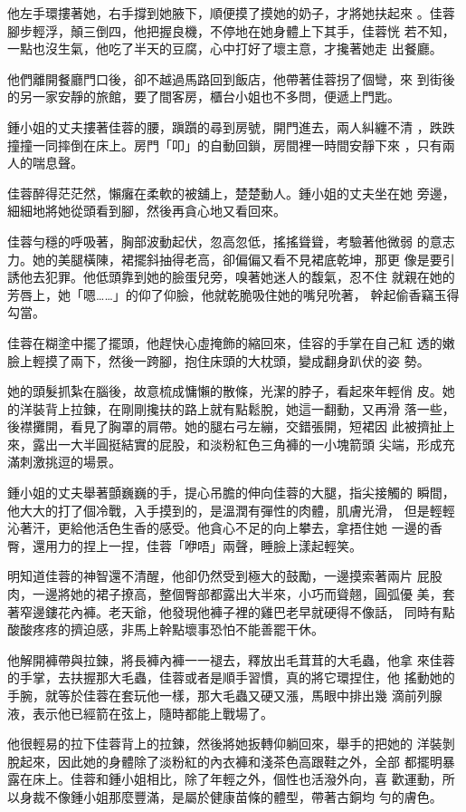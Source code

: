 他左手環摟著她，右手撐到她腋下，順便摸了摸她的奶子，才將她扶起來
。佳蓉腳步輕浮，顛三倒四，他把握良機，不停地在她身體上下其手，佳蓉恍
若不知，一點也沒生氣，他吃了半天的豆腐，心中打好了壞主意，才攙著她走
出餐廳。

他們離開餐廳門口後，卻不越過馬路回到飯店，他帶著佳蓉拐了個彎，來
到街後的另一家安靜的旅館，要了間客房，櫃台小姐也不多問，便遞上門匙。

鍾小姐的丈夫摟著佳蓉的腰，蹎躓的尋到房號，開門進去，兩人糾纏不清
，跌跌撞撞一同摔倒在床上。房門「叩」的自動回鎖，房間裡一時間安靜下來
，只有兩人的喘息聲。

佳蓉醉得茫茫然，懶癱在柔軟的被舖上，楚楚動人。鍾小姐的丈夫坐在她
旁邊，細細地將她從頭看到腳，然後再貪心地又看回來。

佳蓉勻穩的呼吸著，胸部波動起伏，忽高忽低，搖搖聳聳，考驗著他微弱
的意志力。她的美腿橫陳，裙擺斜抽得老高，卻偏偏又看不見裙底乾坤，那更
像是要引誘他去犯罪。他低頭靠到她的臉蛋兒旁，嗅著她迷人的馥氣，忍不住
就親在她的芳唇上，她「嗯……」的仰了仰臉，他就乾脆吸住她的嘴兒吮著，
幹起偷香竊玉得勾當。

佳蓉在糊塗中擺了擺頭，他趕快心虛掩飾的縮回來，佳容的手掌在自己紅
透的嫩臉上輕摸了兩下，然後一跨腳，抱住床頭的大枕頭，變成翻身趴伏的姿
勢。

她的頭髮抓紮在腦後，故意梳成慵懶的散條，光潔的脖子，看起來年輕俏
皮。她的洋裝背上拉鍊，在剛剛攙扶的路上就有點鬆脫，她這一翻動，又再滑
落一些，後襟攤開，看見了胸罩的肩帶。她的腿右弓左繃，交錯張開，短裙因
此被擠扯上來，露出一大半圓挺結實的屁股，和淡粉紅色三角褲的一小塊箭頭
尖端，形成充滿刺激挑逗的場景。

鍾小姐的丈夫舉著顫巍巍的手，提心吊膽的伸向佳蓉的大腿，指尖接觸的
瞬間，他大大的打了個冷戰，入手摸到的，是溫潤有彈性的肉體，肌膚光滑，
但是輕輕沁著汗，更給他活色生香的感受。他貪心不足的向上攀去，拿捂住她
一邊的香臀，還用力的捏上一捏，佳蓉「咿唔」兩聲，睡臉上漾起輕笑。

明知道佳蓉的神智還不清醒，他卻仍然受到極大的鼓勵，一邊摸索著兩片
屁股肉，一邊將她的裙子撩高，整個臀部都露出大半來，小巧而聳翹，圓弧優
美，套著窄邊鏤花內褲。老天爺，他發現他褲子裡的雞巴老早就硬得不像話，
同時有點酸酸疼疼的擠迫感，非馬上幹點壞事恐怕不能善罷干休。

他解開褲帶與拉鍊，將長褲內褲一一褪去，釋放出毛茸茸的大毛蟲，他拿
來佳蓉的手掌，去扶握那大毛蟲，佳蓉或者是順手習慣，真的將它環捏住，他
搖動她的手腕，就等於佳蓉在套玩他一樣，那大毛蟲又硬又漲，馬眼中排出幾
滴前列腺液，表示他已經箭在弦上，隨時都能上戰場了。

他很輕易的拉下佳蓉背上的拉鍊，然後將她扳轉仰躺回來，舉手的把她的
洋裝剝脫起來，因此她的身體除了淡粉紅的內衣褲和淺茶色高跟鞋之外，全部
都擺明暴露在床上。佳蓉和鍾小姐相比，除了年輕之外，個性也活潑外向，喜
歡運動，所以身裁不像鍾小姐那麼豐滿，是屬於健康苗條的體型，帶著古銅均
勻的膚色。

